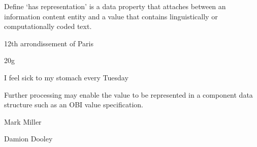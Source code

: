 \documentclass[letterpaper,10pt,english]{sphinxmanual}
\begin{document}
\begin{sphinxShadowBox}

\sphinxAtStartPar
{}
\end{sphinxShadowBox}

\begin{sphinxShadowBox}

\sphinxAtStartPar
Define ‘has representation’ is a data property that attaches between an information content entity and a value that contains linguistically or computationally coded text.
\end{sphinxShadowBox}

\begin{sphinxShadowBox}

\sphinxAtStartPar
12th arrondissement of Paris

\sphinxAtStartPar
20g

\sphinxAtStartPar
I feel sick to my stomach every Tuesday
\end{sphinxShadowBox}

\begin{sphinxShadowBox}

\sphinxAtStartPar
Further processing may enable the value to be represented in a component data structure such as an OBI value specification.
\end{sphinxShadowBox}

\begin{sphinxShadowBox}

\sphinxAtStartPar
{}
\end{sphinxShadowBox}

\begin{sphinxShadowBox}

\sphinxAtStartPar
Mark Miller

\sphinxAtStartPar
Damion Dooley
\end{sphinxShadowBox}
\begin{quote}

\ignorespaces \end{quote}
\end{document}
